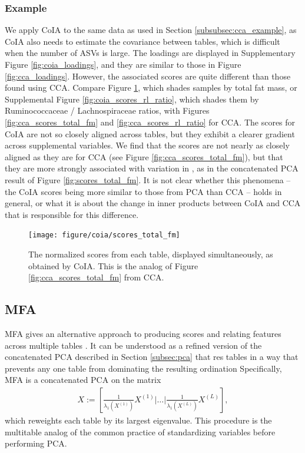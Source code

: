 \documentclass[14pt]{extarticle}
\begin{document}
\subsubsection{Example}
\label{subsubsec:coia_example}

We apply CoIA to the same data as used in Section \ref{subsubsec:cca_example},
as CoIA also needs to estimate the covariance between tables, which is difficult
when the number of ASVs is large. The loadings are displayed in Supplementary
Figure \ref{fig:coia_loadings}, and they are similar to those in Figure
\ref{fig:cca_loadings}. However, the associated scores are quite different than
those found using CCA. Compare Figure \ref{fig:coia_scores_total_fm}, which
shades samples by total fat mass, or Supplemental Figure
\ref{fig:coia_scores_rl_ratio}, which shades them by Ruminococcaceae /
Lachnospiraceae ratios, with Figures \ref{fig:cca_scores_total_fm} and
\ref{fig:cca_scores_rl_ratio} for CCA. The scores for CoIA are not so closely
aligned across tables, but they exhibit a clearer gradient across supplemental
variables. We find that the scores are not nearly as closely aligned as they are
for CCA (see Figure \ref{fig:cca_scores_total_fm}), but that they are more
strongly associated with variation in , as in the concatenated PCA result of
Figure \ref{fig:scores_total_fm}. It is not clear whether this phenomena -- the
CoIA scores being more similar to those from PCA than CCA -- holds in general,
or what it is about the change in inner products between CoIA and CCA that is
responsible for this difference.

\begin{figure}
  \centering
  \texttt{[image: figure/coia/scores\_total\_fm]}
  \caption{The normalized scores from each table, displayed
    simultaneously, as obtained by CoIA. This is the analog of Figure
    \ref{fig:cca_scores_total_fm} from CCA. \label{fig:coia_scores_total_fm} }
\end{figure}

\subsection{MFA}
\label{subsec:mfa}

MFA gives an alternative approach to producing scores and relating features
across multiple tables \citep{pages2014multiple}. It can be understood as a
refined version of the concatenated PCA described in Section \ref{subsec:pca}
that res tables in a way that prevents any one table from dominating the
resulting ordination Specifically, MFA is a concatenated PCA on the matrix
\begin{align*}
X := \left[\frac{1}{\lambda_{1}\left(X^{(1)}\right)}X^{(1)} \vert \dots
  \vert \frac{1}{\lambda_{1}\left(X^{(L)}\right)}X^{(L)}\right],
\end{align*}
which reweights each table by its largest eigenvalue. This procedure is the
multitable analog of the common practice of standardizing variables before
performing PCA.
\end{document}
